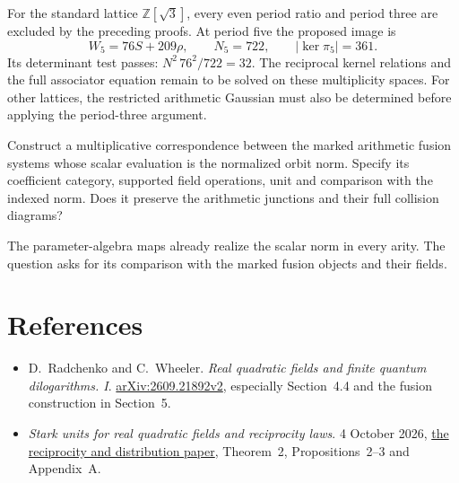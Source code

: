 For the standard lattice \(\mathbb Z[\sqrt3]\), every even
period ratio and period three are excluded by the preceding
proofs. At period five the proposed image is
\[
 W_5=76S+209\rho,\qquad N_5=722,\qquad
 |\ker\pi_5|=361.
\]
Its determinant test passes:
\(N^2\,76^2/722=32\).
The reciprocal kernel relations and the full associator equation
remain to be solved on these multiplicity spaces.
For other lattices, the restricted arithmetic Gaussian must
also be determined before applying the period-three argument.

\begin{question}\label{v4-arith:at:nonlinear-comparison}
Construct a multiplicative correspondence between the marked
arithmetic fusion systems whose scalar evaluation is the
normalized orbit norm.
Specify its coefficient category, supported field operations,
unit and comparison with the indexed norm.
Does it preserve the arithmetic junctions and their full
collision diagrams?
\end{question}

The parameter-algebra maps already realize the scalar norm in
every arity. The question asks for its comparison with the
marked fusion objects and their fields.

\section{References}

\begin{itemize}
\item D.~Radchenko and C.~Wheeler.
\emph{Real quadratic fields and finite quantum dilogarithms. I}.
\href{https://arxiv.org/abs/2609.21892v2}{arXiv:2609.21892v2},
especially Section~4.4 and the fusion construction in Section~5.

\item \emph{Stark units for real quadratic fields and reciprocity laws}.
4 October 2026,
\href{https://www.danrad.net/papers/stark-reciprocity.pdf}
{the reciprocity and distribution paper},
Theorem~2, Propositions~2--3 and Appendix~A.
\end{itemize}
